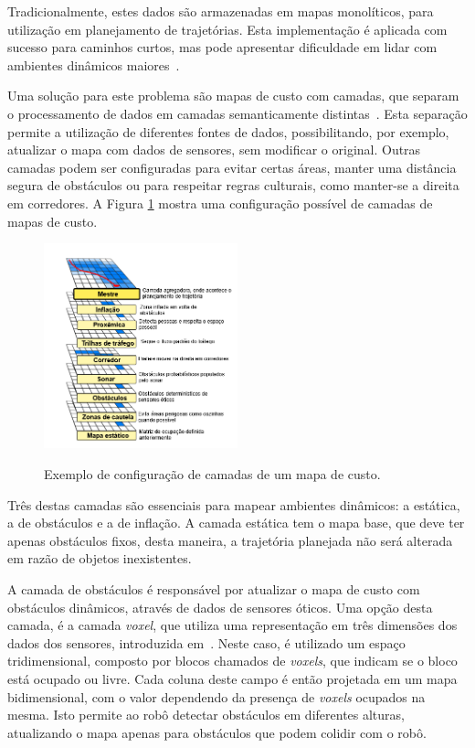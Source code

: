 \documentclass[repeatfields,xlists,xpacks,oneside,yearsonly]{ufrgscca}
\begin{document}
Tradicionalmente, estes dados são armazenadas em mapas monolíticos,
para utilização em planejamento de trajetórias. Esta implementação é
aplicada com sucesso para caminhos curtos, mas pode apresentar
dificuldade em lidar com ambientes dinâmicos
maiores~\cite{latombeRobotMotionPlanning}.

Uma solução para este problema são mapas de custo com camadas, que
separam o processamento de dados em camadas semanticamente
distintas~\cite{layered_costmaps}. Esta separação permite a
utilização de diferentes fontes de dados, possibilitando, por
exemplo, atualizar o mapa com dados de sensores, sem modificar o
original. Outras camadas podem ser configuradas para evitar certas
áreas, manter uma distância segura de obstáculos ou para respeitar
regras culturais, como manter-se a direita em corredores. A Figura
\ref{fig:mapa_camadas} mostra uma configuração possível de camadas de
mapas de custo.

\begin{figure}[h]
    {
        \centering
        \caption{Exemplo de configuração de camadas de um mapa de custo.}
        \label{fig:mapa_camadas}
        \includegraphics[width=0.5\textwidth]{mapa_camadas_trad.png}\\
    }
    {}
\end{figure}

Três destas camadas são essenciais para mapear ambientes dinâmicos: a
estática, a de obstáculos e a de inflação. A camada estática tem o
mapa base, que deve ter apenas obstáculos fixos, desta maneira, a
trajetória planejada não será alterada em razão de objetos
inexistentes.

A camada de obstáculos é responsável por atualizar o mapa de custo
com obstáculos dinâmicos, através de dados de sensores óticos. Uma
opção desta camada, é a camada \textit{voxel}, que utiliza uma
representação em três dimensões dos dados dos sensores, introduzida
em~\textcite{office_marathon}. Neste caso, é utilizado um espaço
tridimensional, composto por blocos chamados de \textit{voxels}, que
indicam se o bloco está ocupado ou livre. Cada coluna deste campo é
então projetada em um mapa bidimensional, com o valor dependendo da
presença de \textit{voxels} ocupados na mesma. Isto permite ao robô
detectar obstáculos em diferentes alturas, atualizando o mapa apenas
para obstáculos que podem colidir com o robô.
\end{document}
